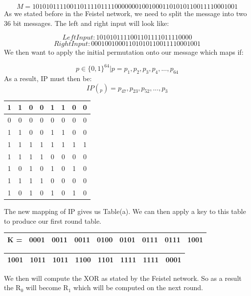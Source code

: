 \documentclass[11pt,a4paper]{report}
\begin{document}
\begin{displaymath}
M = 1010 1011 1100 1101 1110 1111 0000 0001 0010 0011 0101 0110 0111 1000 1001
\end{displaymath}
As we stated before in the Feistel network, we need to split the message into two 36 bit messages. The left and right input will look like:

\begin{displaymath}
Left Input: 1010 1011 1100 1101 1110 1111 0000
\end{displaymath}
\begin{displaymath}
Right Input: 0001 0010 0011 0101 0110 0111 1000 1001
\end{displaymath}
We then want to apply the initial permutation onto our message which maps if:

\begin{displaymath}
p \in \{0,1\}^{64} | p = p_{1}, p_{2}, p_{3}, p_{4},...,p_{64} 
\end{displaymath}
As a result, IP must then be:
\begin{displaymath}
IP(_{p}) = p_{47}, p_{23}, p_{52},...,p_{3}
\end{displaymath}

\begin{center}
\begin{tabular}{ |c|c|c|c|c|c|c|c| }
\hline
1 & 1 & 0 & 0 & 1 & 1 & 0 & 0\\ \hline
0 & 0 & 0 & 0 & 0 & 0 & 0 & 0\\ \hline
1 & 1 & 0 & 0 & 1 & 1 & 0 & 0\\ \hline
1 & 1 & 1 & 1 & 1 & 1 & 1 & 1\\ \hline
1 & 1 & 1 & 1 & 0 & 0 & 0 & 0\\ \hline
1 & 0 & 1 & 0 & 1 & 0 & 1 & 0\\ \hline
1 & 1 & 1 & 1 & 0 & 0 & 0 & 0\\ \hline
1 & 0 & 1 & 0 & 1 & 0 & 1 & 0\\ \hline
\end{tabular}
\end{center}
The new mapping of IP gives us Table(a). We can then apply a key to this table to produce our first round table.

\begin{tabular}{|c|c|c|c|c|c|c|c|c|} \hline
K = & 0001 & 0011 & 0011 & 0100 & 0101 & 0111 & 0111 & 1001 
\\ \hline
\end{tabular} 

\begin{center}
\begin{tabular}{|c|c|c|c|c|c|c|c|} \hline
1001 & 1011 & 1011 & 1100 & 1101 & 1111 & 1111 & 0001\\ \hline
\end{tabular}
\end{center}
We then will compute the XOR as stated by the Feistel network. So as a result the R$_{0}$ will become R$_{1}$ which will be computed on the next round.
\end{document}
